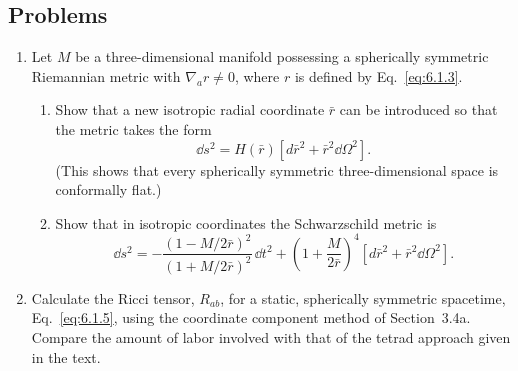 
\subsection*{Problems}

\begin{enumerate}[label=\arabic*., leftmargin=*, itemsep=1.1em]
\item Let \(M\) be a three-dimensional manifold possessing a spherically
  symmetric Riemannian metric with \(\nabla_a r\ne0\), where \(r\) is defined by
  Eq.~\eqref{eq:6.1.3}.
  \begin{enumerate}[label=\alph*), leftmargin=2.2em, itemsep=.45em]
  \item Show that a new isotropic radial coordinate \(\bar r\) can be introduced
    so that the metric takes the form
    \[
      \dd s^2=H(\bar r)[d\bar r^2+\bar r^2\dd\Omega^2].
    \]
    (This shows that every spherically symmetric three-dimensional space is
    conformally flat.)
  \item Show that in isotropic coordinates the Schwarzschild metric is
    \[
      \dd s^2=-\frac{(1-M/2\bar r)^2}{(1+M/2\bar r)^2}\,\dd t^2+
      \left(1+\frac{M}{2\bar r}\right)^4
      [d\bar r^2+\bar r^2\dd\Omega^2].
    \]
  \end{enumerate}

\item Calculate the Ricci tensor, \(R_{ab}\), for a static, spherically symmetric
  spacetime, Eq.~\eqref{eq:6.1.5}, using the coordinate component method of
  Section~3.4a. Compare the amount of labor involved with that of the tetrad
  approach given in the text.


\end{enumerate}
